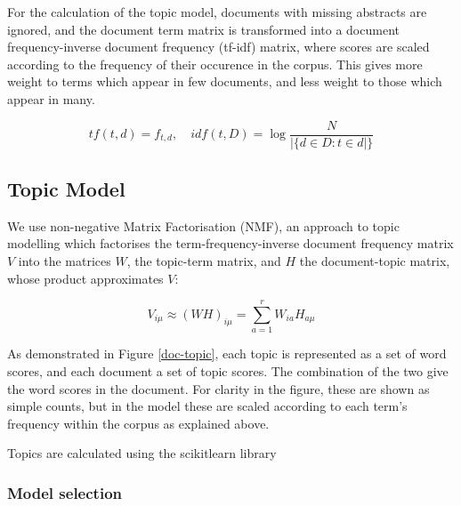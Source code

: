 \documentclass{article}
\begin{document}
\begin{linenumbers}
	For the calculation of the topic model, documents with missing abstracts are ignored, and the document term matrix is transformed into a document
	frequency-inverse document frequency (tf-idf) matrix, where scores are scaled according to the frequency of their occurence in the corpus. This gives more weight to terms which appear in few documents, and less weight to those which appear in many.
	
	\begin{equation}
	tf(t,d) = f_{t,d} \mathrm{,}\quad idf(t,D) = \log\frac{N}{|\{d \in D:t \in d|\}}
	\end{equation} 
	
	\subsection*{Topic Model}
	
	We use non-negative Matrix Factorisation (NMF), an approach to topic modelling which factorises the term-frequency-inverse document frequency matrix \( V \) into the matrices \(W\), the topic-term matrix, and \( H \) the document-topic matrix, whose product approximates \(V\):
	
	\begin{equation}
		V_{i\mu} \approx (WH)_{i\mu} = \sum_{a=1}^{r}W_{ia}H_{a\mu}
	\end{equation}
	
	As demonstrated in Figure \ref{doc-topic}, each topic is represented as a set of word scores, and each document a set of topic scores. The combination of the two give the word scores in the document. For clarity in the figure, these are shown as simple counts, but in the model these are scaled according to each term's frequency within the corpus as explained above.
	
	Topics are calculated using the scikitlearn library \cite{Pedregosa2011}	
	
	\subsubsection*{Model selection}
	
%	
%	
	


\end{linenumbers}
\end{document}

